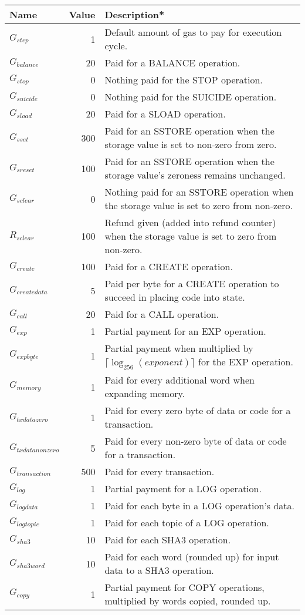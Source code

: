 \documentclass[9pt,oneside]{amsart}
\begin{document}
\begin{tabular*}{\columnwidth}[h]{lrl}
\toprule
Name & Value & Description* \\
\midrule
$G_{step}$ & 1 & Default amount of gas to pay for execution cycle. \\
$G_{balance}$ & 20 & Paid for a {\small BALANCE} operation. \\
$G_{stop}$ & 0 & Nothing paid for the {\small STOP} operation. \\
$G_{suicide}$ & 0 & Nothing paid for the {\small SUICIDE} operation. \\
$G_{sload}$ & 20 & Paid for a {\small SLOAD} operation. \\
$G_{sset}$ & 300 & Paid for an {\small SSTORE} operation when the storage value is set to non-zero from zero. \\
$G_{sreset}$ & 100 & Paid for an {\small SSTORE} operation when the storage value's zeroness remains unchanged. \\
$G_{sclear}$ & 0 & Nothing paid for an {\small SSTORE} operation when the storage value is set to zero from non-zero. \\
$R_{sclear}$ & 100 & Refund given (added into refund counter) when the storage value is set to zero from non-zero. \\
$G_{create}$ & 100 & Paid for a {\small CREATE} operation. \\
$G_{createdata}$ & 5 & Paid per byte for a {\small CREATE} operation to succeed in placing code into state. \\
$G_{call}$ & 20 & Paid for a {\small CALL} operation. \\
$G_{exp}$ & 1 & Partial payment for an {\small EXP} operation. \\
$G_{expbyte}$ & 1 & Partial payment when multiplied by $\lceil\log_{256}(exponent)\rceil$ for the {\small EXP} operation. \\
$G_{memory}$ & 1 & Paid for every additional word when expanding memory. \\
$G_{txdatazero}$ & 1 & Paid for every zero byte of data or code for a transaction. \\
$G_{txdatanonzero}$ & 5 & Paid for every non-zero byte of data or code for a transaction. \\
$G_{transaction}$ & 500 & Paid for every transaction. \\
$G_{log}$ & 1 & Partial payment for a {\small LOG} operation. \\
$G_{logdata}$ & 1 & Paid for each byte in a {\small LOG} operation's data. \\
$G_{logtopic}$ & 1 & Paid for each topic of a {\small LOG} operation. \\
$G_{sha3}$ & 10 & Paid for each {\small SHA3} operation. \\
$G_{sha3word}$ & 10 & Paid for each word (rounded up) for input data to a {\small SHA3} operation. \\
$G_{copy}$ & 1 & Partial payment for {\small *COPY} operations, multiplied by words copied, rounded up. \\


\end{tabular*}
\end{document}
